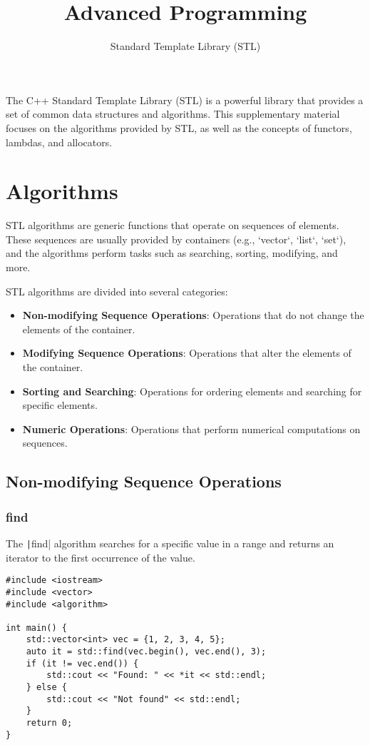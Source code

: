 \documentclass{article}
\title{Advanced Programming}
\author{Standard Template Library (STL)}
\date{}
\begin{document}
\maketitle


The C++ Standard Template Library (STL) is a powerful library that provides a set of common data structures and algorithms. This supplementary material focuses on the algorithms provided by STL, as well as the concepts of functors, lambdas, and allocators.

\section{Algorithms}

STL algorithms are generic functions that operate on sequences of elements. These sequences are usually provided by containers (e.g., `vector`, `list`, `set`), and the algorithms perform tasks such as searching, sorting, modifying, and more.

STL algorithms are divided into several categories:
\begin{itemize}
    \item \textbf{Non-modifying Sequence Operations}: Operations that do not change the elements of the container.
    \item \textbf{Modifying Sequence Operations}: Operations that alter the elements of the container.
    \item \textbf{Sorting and Searching}: Operations for ordering elements and searching for specific elements.
    \item \textbf{Numeric Operations}: Operations that perform numerical computations on sequences.
\end{itemize}

\subsection{Non-modifying Sequence Operations}

\subsubsection{find}
The \texttt|find| algorithm searches for a specific value in a range and returns an iterator to the first occurrence of the value.
\begin{verbatim}
#include <iostream>
#include <vector>
#include <algorithm>

int main() {
    std::vector<int> vec = {1, 2, 3, 4, 5};
    auto it = std::find(vec.begin(), vec.end(), 3);
    if (it != vec.end()) {
        std::cout << "Found: " << *it << std::endl;
    } else {
        std::cout << "Not found" << std::endl;
    }
    return 0;
}
\end{verbatim}
\end{document}
